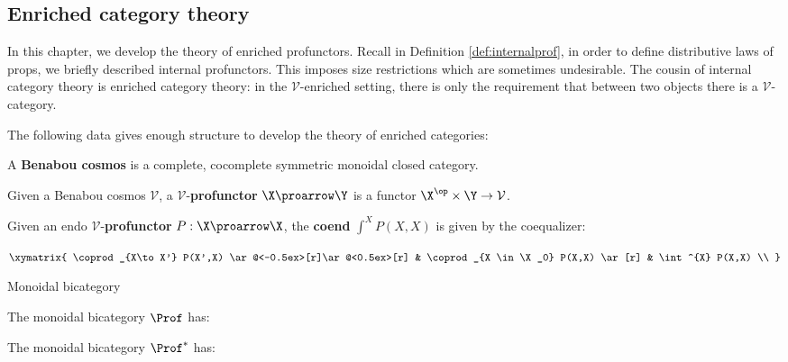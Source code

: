 \subsection{Enriched category theory}
In this chapter, we develop the theory of enriched profunctors.  Recall in Definition \ref{def:internalprof}, in order to define distributive laws of props, we briefly described internal profunctors.  This imposes size restrictions which are sometimes undesirable. The cousin of internal category theory is enriched category theory:  in the $\mathcal V$-enriched setting, there is only the requirement that between two objects there is a $\mathcal V$-category.  


The following data gives enough structure to develop the theory of enriched categories: 
\begin{definition}
A {\bf Benabou cosmos } is a complete, cocomplete symmetric monoidal closed category.
\end{definition}



\begin{definition}
Given a Benabou cosmos ${\mathcal V}$,  a $\mathcal V$-{\bf profunctor} $\X \proarrow \Y$ is a functor  $\X^\op \times \Y \to \mathcal V$.
\end{definition}


\begin{definition}
Given an endo $\mathcal V$-{\bf profunctor} $P:\X \proarrow \X$, the  {\bf coend} $\int^{X} P(X,X) $ is given by the coequalizer:

$
  \xymatrix{
      \coprod_{X\to X'} P(X',X)  \ar@<-0.5ex>[r]\ar@<0.5ex>[r] &
      \coprod_{X \in \X_0} P(X,X) \ar[r] &
  	\int^{X} P(X,X) \\
  }
$

\end{definition}



\begin{lemma}
Monoidal bicategory
\end{lemma}


\begin{definition}
The monoidal bicategory $\Prof$ has:

\end{definition}



\begin{definition}
The monoidal bicategory $\Prof^*$ has:


\end{definition}


